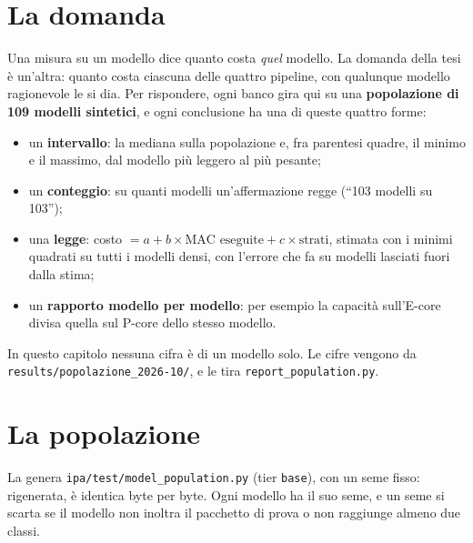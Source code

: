 \documentclass[11pt,a4paper,oneside]{report}
\begin{document}
\section{La domanda}

Una misura su un modello dice quanto costa \emph{quel} modello. La domanda della
tesi è un'altra: quanto costa ciascuna delle quattro pipeline, con qualunque
modello ragionevole le si dia. Per rispondere, ogni banco gira qui su una
\textbf{popolazione di 109 modelli sintetici}, e ogni conclusione ha una di
queste quattro forme:

\begin{itemize}
  \item un \textbf{intervallo}: la mediana sulla popolazione e, fra parentesi
        quadre, il minimo e il massimo, dal modello più leggero al più pesante;
  \item un \textbf{conteggio}: su quanti modelli un'affermazione regge
        (``103 modelli su 103'');
  \item una \textbf{legge}: costo $= a + b \times \text{MAC eseguite} + c \times
        \text{strati}$, stimata con i minimi quadrati su tutti i modelli densi,
        con l'errore che fa su modelli lasciati fuori dalla stima;
  \item un \textbf{rapporto modello per modello}: per esempio la capacità
        sull'E-core divisa quella sul P-core dello stesso modello.
\end{itemize}

\begin{lezione}
In questo capitolo nessuna cifra è di un modello solo. Le cifre vengono da
\texttt{results/popolazione\_2026-10/}, e le tira
\texttt{report\_population.py}.
\end{lezione}

\section{La popolazione}

La genera \texttt{ipa/test/model\_population.py} (tier \texttt{base}), con un seme
fisso: rigenerata, è identica byte per byte. Ogni modello ha il suo seme, e un
seme si scarta se il modello non inoltra il pacchetto di prova o non raggiunge
almeno due classi.
\end{document}
